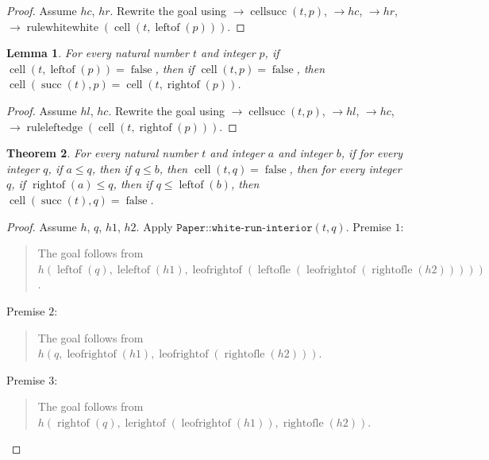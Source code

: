 \documentclass[11pt]{article}
\newtheorem{theorem}{Theorem}[section]
\newtheorem{lemma}[theorem]{Lemma}
\theoremstyle{definition}
\begin{document}
\begin{proof}
Assume \(hc\), \(hr\).
Rewrite the goal using \(\rightarrow \operatorname{cellsucc}(t, p)\), \(\rightarrow hc\), \(\rightarrow hr\), \(\rightarrow \operatorname{rulewhitewhite}(\operatorname{cell}(t, \operatorname{leftof}(p)))\).
\end{proof}
\begin{lemma}
\label{ll:paper:white-pair-left}
For every natural number \(t\) and integer \(p\), if \(\operatorname{cell}(t, \operatorname{leftof}(p)) = \operatorname{false}\), then if \(\operatorname{cell}(t, p) = \operatorname{false}\), then \(\operatorname{cell}(\operatorname{succ}(t), p) = \operatorname{cell}(t, \operatorname{rightof}(p))\).
\end{lemma}
\begin{proof}
Assume \(hl\), \(hc\).
Rewrite the goal using \(\rightarrow \operatorname{cellsucc}(t, p)\), \(\rightarrow hl\), \(\rightarrow hc\), \(\rightarrow \operatorname{ruleleftedge}(\operatorname{cell}(t, \operatorname{rightof}(p)))\).
\end{proof}
\begin{theorem}
\label{ll:paper:white-run-shrinks}
For every natural number \(t\) and integer \(a\) and integer \(b\), if for every integer \(q\), if \(a \le q\), then if \(q \le b\), then \(\operatorname{cell}(t, q) = \operatorname{false}\), then for every integer \(q\), if \(\operatorname{rightof}(a) \le q\), then if \(q \le \operatorname{leftof}(b)\), then \(\operatorname{cell}(\operatorname{succ}(t), q) = \operatorname{false}\).
\end{theorem}
\begin{proof}
Assume \(h\), \(q\), \(h1\), \(h2\).
Apply \(\texttt{Paper::white-run-interior}(t, q)\).
Premise \(1\):
\begin{quote}
The goal follows from \(h(\operatorname{leftof}(q), \operatorname{leleftof}(h1), \operatorname{leofrightof}(\operatorname{leftofle}(\operatorname{leofrightof}(\operatorname{rightofle}(h2)))))\).
\end{quote}
Premise \(2\):
\begin{quote}
The goal follows from \(h(q, \operatorname{leofrightof}(h1), \operatorname{leofrightof}(\operatorname{rightofle}(h2)))\).
\end{quote}
Premise \(3\):
\begin{quote}
The goal follows from \(h(\operatorname{rightof}(q), \operatorname{lerightof}(\operatorname{leofrightof}(h1)), \operatorname{rightofle}(h2))\).
\end{quote}
\end{proof}
\end{document}
